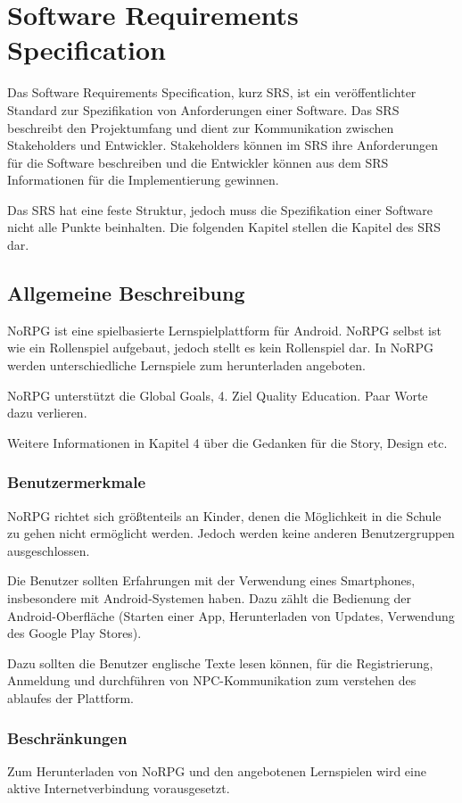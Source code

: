 \chapter{Software Requirements Specification}
	Das Software Requirements Specification, kurz SRS, ist ein veröffentlichter Standard zur Spezifikation von Anforderungen einer Software. Das SRS beschreibt den Projektumfang und dient zur Kommunikation zwischen Stakeholders und Entwickler. Stakeholders können im SRS ihre Anforderungen für die Software beschreiben und die Entwickler können aus dem SRS Informationen für die Implementierung gewinnen.
	
	Das SRS hat eine feste Struktur, jedoch muss die Spezifikation einer Software nicht alle Punkte beinhalten. Die folgenden Kapitel stellen die Kapitel des SRS dar.
	
\section{Allgemeine Beschreibung}
	NoRPG ist eine spielbasierte Lernspielplattform für Android. NoRPG selbst ist wie ein Rollenspiel aufgebaut, jedoch stellt es kein Rollenspiel dar. In NoRPG werden unterschiedliche Lernspiele zum herunterladen angeboten.
	
	NoRPG unterstützt die Global Goals, 4. Ziel Quality Education. Paar Worte dazu verlieren.	
	
	Weitere Informationen in Kapitel 4 über die Gedanken für die Story, Design etc.
	
	\subsection{Benutzermerkmale}
		NoRPG richtet sich größtenteils an Kinder, denen die Möglichkeit in die Schule zu gehen nicht ermöglicht werden. Jedoch werden keine anderen Benutzergruppen ausgeschlossen.
		
		Die Benutzer sollten Erfahrungen mit der Verwendung eines Smartphones, insbesondere mit Android-Systemen haben. Dazu zählt die Bedienung der Android-Oberfläche (Starten einer App, Herunterladen von Updates, Verwendung des Google Play Stores). 
		
		Dazu sollten die Benutzer englische Texte lesen können, für die Registrierung, Anmeldung und durchführen von NPC-Kommunikation zum verstehen des ablaufes der Plattform.
	
	\subsection{Beschränkungen} 
		Zum Herunterladen von NoRPG und den angebotenen Lernspielen wird eine aktive Internetverbindung vorausgesetzt.
		
